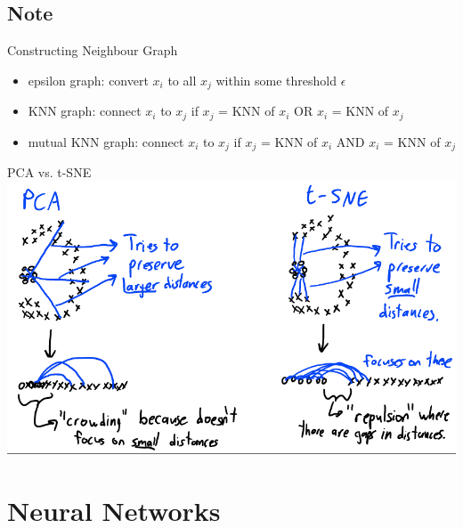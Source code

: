 \documentclass[10pt,landscape,a4paper]{article}
\begin{document}
\begin{multicols*}{5}
\subsection{Note}
Constructing Neighbour Graph
\begin{itemize}
    \item epsilon graph: convert \(x_i\) to all \(x_j\) within some threshold \(\epsilon \)
    \item KNN graph: connect \(x_i\) to \(x_j\) if \(x_j\) = KNN of \(x_i\) OR \(x_i\) = KNN of \(x_j\)
    \item mutual KNN graph: connect \(x_i\) to \(x_j\) if \(x_j\) = KNN of \(x_i\) AND \(x_i\) = KNN of \(x_j\)
\end{itemize}
PCA vs. t-SNE \\
\includegraphics[scale=0.15]{isomap_vs_t-sne}

\section{Neural Networks}


\end{multicols*}
\end{document}
